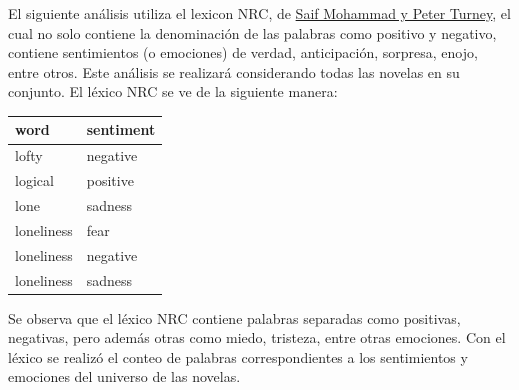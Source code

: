 \documentclass[
]{article}
\begin{document}
El siguiente análisis utiliza el lexicon NRC, de
\href{http://saifmohammad.com/WebPages/NRC-Emotion-Lexicon.htm}{Saif
Mohammad y Peter Turney}, el cual no solo contiene la denominación de
las palabras como positivo y negativo, contiene sentimientos (o
emociones) de verdad, anticipación, sorpresa, enojo, entre otros. Este
análisis se realizará considerando todas las novelas en su conjunto. El
léxico NRC se ve de la siguiente manera:

\begin{table}[H]
\centering
\begin{tabular}[t]{l|l}
\hline
word & sentiment\\
\hline
lofty & negative\\
\hline
logical & positive\\
\hline
lone & sadness\\
\hline
loneliness & fear\\
\hline
loneliness & negative\\
\hline
loneliness & sadness\\
\hline
\end{tabular}
\end{table}

Se observa que el léxico NRC contiene palabras separadas como positivas,
negativas, pero además otras como miedo, tristeza, entre otras
emociones. Con el léxico se realizó el conteo de palabras
correspondientes a los sentimientos y emociones del universo de las
novelas.
\end{document}
